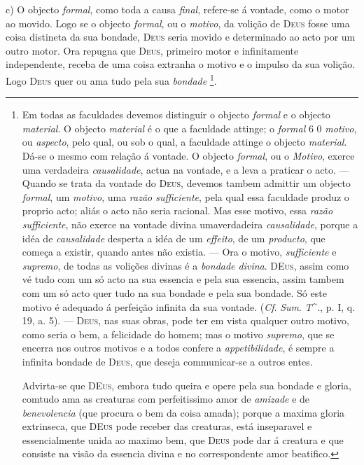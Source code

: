 c) O objecto \emph{formal}, como toda a causa \emph{final}, refere-se á vontade, como o motor ao movido. Logo se o objecto \emph{formal}, ou o \emph{motivo}, da volição de \textsc{Deus} fosse uma coisa distineta da sua bondade, \textsc{Deus} seria movido e determinado ao acto por um outro motor. Ora repugna que \textsc{Deus}, primeiro motor e infinitamente independente, receba de uma coisa extranha o motivo e o impulso da sua volição. Logo \textsc{Deus} quer ou ama tudo pela sua \emph{bondade} \footnote{Em todas as faculdades devemos distinguir o objecto \emph{formal} e o objecto \emph{material}. O objecto \emph{material} é o que a faculdade attinge; o \emph{formal} 6 0 \emph{motivo}, ou \emph{aspecto}, pelo qual, ou sob o qual, a faculdade attinge o objecto \emph{material}. Dá-se o mesmo com relação á vontade. O objecto \emph{formal}, ou o \emph{Motivo}, exerce uma verdadeira \emph{causalidade}, actua na vontade, e a leva a praticar o acto. --- Quando se trata da vontade do \textsc{Deus}, devemos tambem admittir um objecto \emph{formal}, um \emph{motivo}, uma \emph{razão sufficiente}, pela qual essa faculdade produz o proprio acto; aliás o acto não seria racional. Mas esse motivo, essa \emph{razão sufficiente}, não exerce na vontade divina umaverdadeira \emph{causalidade}, porque a idéa de \emph{causalidade} desperta a idéa de um \emph{effeito}, de um \emph{producto}, que começa a existir, quando antes não existia. --- Ora o motivo, \emph{sufficiente} e \emph{supremo}, de todas as volições divinas é a \emph{bondade divina}. \textsc{DEus}, assim como vé tudo com um só acto na sua essencia e pela sua essencia, assim tambem com um só acto quer tudo na sua bondade e pela sua bondade. Só este motivo é adequado á perfeição infinita da sua vontade. (\emph{Cf}. \emph{Sum}. \emph{T}\textasciicircum{}., p. I, q. 19, a. 5). --- \textsc{Deus}, nas suas obras, pode ter em vista qualquer outro motivo, como seria o bem, a felicidade do homem; mas o motivo \emph{supremo}, que se encerra nos outros motivos e a todos confere a \emph{appetibilidade}, é sempre a infinita bondade de \textsc{Deus}, que deseja communicar-se a outros entes.\par Advirta-se que \textsc{DEus}, embora tudo queira e opere pela sua bondade e gloria, comtudo ama as creaturas com perfeitissimo amor de \emph{amizade} e de \emph{benevolencia} (que procura o bem da coisa amada); porque a maxima gloria extrinseca, que \textsc{DEus} pode receber das creaturas, está inseparavel e essencialmente unida ao maximo bem, que \textsc{Deus} pode dar á creatura e que consiste na visão da essencia divina e no correspondente amor beatifico.}.

